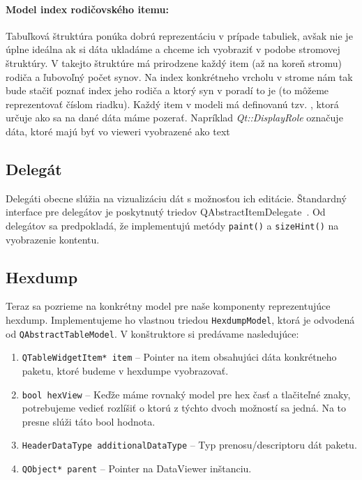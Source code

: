 \paragraph{Model index rodičovského itemu:}  Tabuľková štruktúra ponúka dobrú reprezentáciu v prípade tabuliek, avšak nie je úplne ideálna ak si dáta ukladáme a chceme ich vyobraziť v podobe stromovej štruktúry. V takejto štruktúre má prirodzene každý item (až na koreň stromu) rodiča a ľubovoľný počet synov. Na index konkrétneho vrcholu v strome nám tak bude stačiť poznať index jeho rodiča a ktorý syn v poradí to je (to môžeme reprezentovať číslom riadku).
Každý item v modeli má definovanú tzv. , ktorá určuje ako sa na dané dáta máme pozerať. Napríklad \textit{Qt::DisplayRole} označuje dáta, ktoré majú byť vo vieweri vyobrazené ako text


\subsection{Delegát}
\label{kap04:sec:delegate}
Delegáti obecne slúžia na vizualizáciu dát s možnosťou ich editácie. Štandardný interface pre delegátov je poskytnutý triedov QAbstractItemDelegate~\cite{qabstractitemdelegate}. Od delegátov sa predpokladá, že implementujú metódy \texttt{paint()} a \texttt{sizeHint()} na vyobrazenie kontentu.


\subsection{Hexdump}
Teraz sa pozrieme na konkrétny model pre naše komponenty reprezentujúce hexdump. Implementujeme ho vlastnou triedou \texttt{HexdumpModel}, ktorá je odvodená od \texttt{QAbstractTableModel}. V konštruktore si predávame nasledujúce:
\begin{enumerate}
\item \texttt{QTableWidgetItem* item} -- Pointer na item obsahujúci dáta konkrétneho paketu, ktoré budeme v hexdumpe vyobrazovať.

\item \texttt{bool hexView} -- Keďže máme rovnaký model pre hex časť a tlačiteľné znaky, potrebujeme vedieť rozlíšiť o ktorú z týchto dvoch možností sa jedná. Na to presne slúži táto bool hodnota.

\item \texttt{HeaderDataType additionalDataType} -- Typ prenosu/descriptoru dát paketu.

\item \texttt{QObject* parent} -- Pointer na DataViewer inštanciu.
\end{enumerate}

